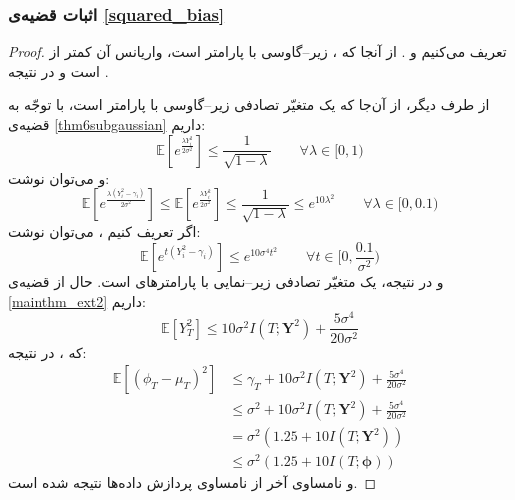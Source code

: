 \documentclass[a4paper,12pt]{article}
\newcommand{\E}{\mathbb{E}}
\newcommand{\bfphi}{\bm {\phi}}
\begin{document}
	\subsubsection{اثبات قضیه‌ی
		\eqref{squared_bias}}
	\begin{proof}
		تعریف می‌کنیم
		و
		\lr{$\gamma_i = \E\left[(\phi_i-\mu_i)^2\right]$}.
		از آنجا که
		،
		زیر--گاوسی با پارامتر
		\lr{$\sigma$}
		است، واریانس آن کمتر از
		است و در نتیجه
		.
		
		از طرف دیگر، از آن‌جا که
		یک متغیّر تصادفی زیر--گاوسی با پارامتر
		\lr{$\sigma$}
		است، با توجّه به قضیه‌ی
		\eqref{thm6subgaussian}
		داریم:
		\begin{equation}
		\E\left[e^{\frac{\lambda Y_i^2}{2\sigma^2}}\right] \leq \frac{1}{\sqrt{1-\lambda}}\qquad \forall \lambda \in [0,1)
		\end{equation}
		و می‌توان نوشت:
		\begin{equation}
		\E\left[e^{\frac{\lambda (Y_i^2-\gamma_i)}{2\sigma^2}}\right] \leq \E\left[e^{\frac{\lambda Y_i^2}{2\sigma^2}}\right] \leq \frac{1}{\sqrt{1-\lambda}}\leq e^{10\lambda^2}\qquad \forall \lambda \in [0,0.1)
		\end{equation}
		اگر تعریف کنیم
		،
		می‌توان نوشت:
		\begin{equation}
		\E\left[e^{t (Y_i^2-\gamma_i)}\right] \leq e^{10\sigma^4t^2} \qquad \forall t\in [0,\frac{0.1}{\sigma^2})
		\end{equation}
		و در نتیجه،
		یک متغیّر تصادفی زیر--نمایی با پارامترهای
		است. حال از قضیه‌ی
		\eqref{mainthm_ext2}
		داریم:
		\[\E[Y_T^2]\leq 10\sigma^2I(T;\bm{Y}^2) + \frac{5\sigma^4}{20\sigma^2}\]
		که
		،
		در نتیجه:
		\begin{align}
		\E\left[(\phi_T-\mu_T)^2\right] &\leq \gamma_T + 10\sigma^2I(T;\bm{Y}^2) + \frac{5\sigma^4}{20\sigma^2}\\
		&\leq \sigma^2 + 10\sigma^2I(T;\bm{Y}^2) + \frac{5\sigma^4}{20\sigma^2}\\
		&= \sigma^2(1.25 + 10I(T;\bm{Y}^2))\\
		&\leq  \sigma^2(1.25 + 10I(T;\bfphi))
		\end{align}
		و نامساوی آخر از نامساوی پردازش داده‌ها نتیجه شده است.
	\end{proof}
\end{document}
